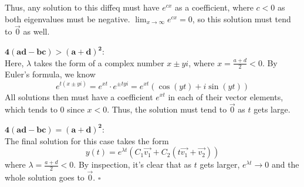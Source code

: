 \documentclass[12pt]{article}
\begin{document}
\begin{enumerate}
          Thus, any solution to this diffeq must have $e^{cx}$ as a coefficient,
          where $c<0$ as both eigenvalues must be negative.
          $\lim_{x \to \infty} e^{cx}=0$, so this solution must tend to $\vec{0}$ as well.

          $\mathbf{4(ad-bc) > (a+d)^2}$: \\
          Here, $\lambda$ takes the form of a complex number $x \pm yi$, where $x=\frac{a+d}{2} < 0$.
          By Euler's formula, we know
          \[e^{t(x \pm yi)}=e^{xt} \cdot e^{\pm tyi}=e^{xt}(\cos(yt)+i\sin(yt))\]
          All solutions then must have a coefficient $e^{xt}$ in each of their vector elements,
          which tends to $0$ since $x < 0$.
          Thus, the solution must tend to $\vec{0}$ as $t$ gets large.

          $\mathbf{4(ad-bc) = (a+d)^2}$: \\
          The final solution for this case takes the form
          \[y(t)=e^{\lambda t}\left(C_1\vec{v_1}+C_2\left(t\vec{v_1}+\vec{v_2}\right)\right)\]
          where $\lambda=\frac{a+d}{2}<0$.
          By inspection, it's clear that as $t$ gets larger, $e^{\lambda t} \to 0$
          and the whole solution goes to $\vec{0}$. $\square$
\end{enumerate}
\end{document}
